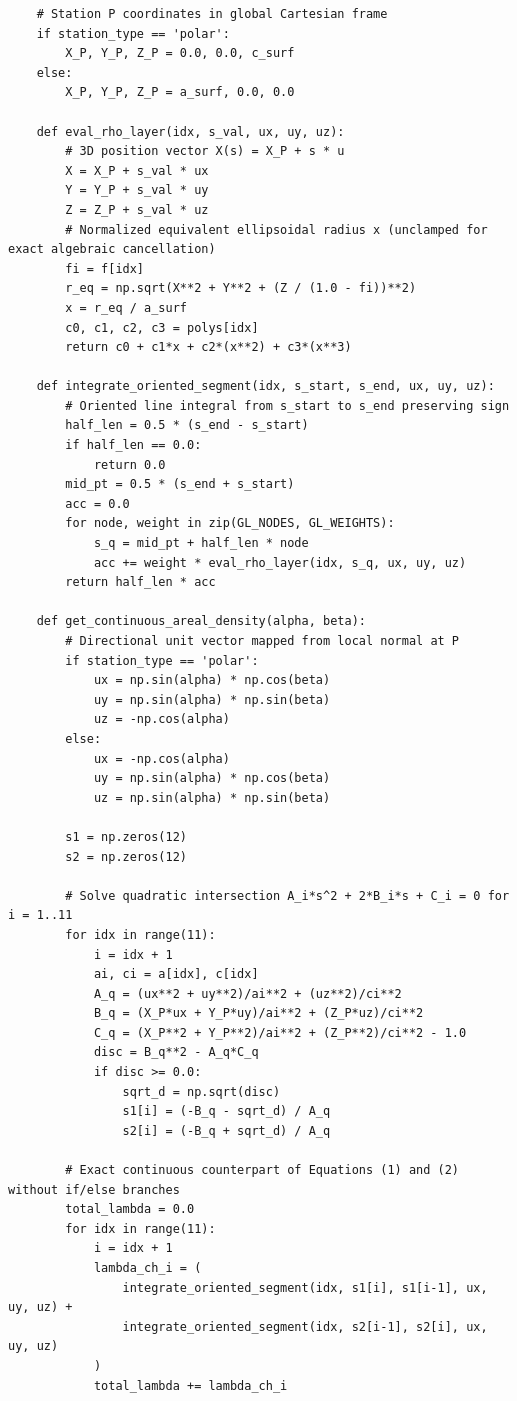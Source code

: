 \begin{lstlisting}
    # Station P coordinates in global Cartesian frame
    if station_type == 'polar':
        X_P, Y_P, Z_P = 0.0, 0.0, c_surf
    else:
        X_P, Y_P, Z_P = a_surf, 0.0, 0.0

    def eval_rho_layer(idx, s_val, ux, uy, uz):
        # 3D position vector X(s) = X_P + s * u
        X = X_P + s_val * ux
        Y = Y_P + s_val * uy
        Z = Z_P + s_val * uz
        # Normalized equivalent ellipsoidal radius x (unclamped for exact algebraic cancellation)
        fi = f[idx]
        r_eq = np.sqrt(X**2 + Y**2 + (Z / (1.0 - fi))**2)
        x = r_eq / a_surf
        c0, c1, c2, c3 = polys[idx]
        return c0 + c1*x + c2*(x**2) + c3*(x**3)

    def integrate_oriented_segment(idx, s_start, s_end, ux, uy, uz):
        # Oriented line integral from s_start to s_end preserving sign
        half_len = 0.5 * (s_end - s_start)
        if half_len == 0.0:
            return 0.0
        mid_pt = 0.5 * (s_end + s_start)
        acc = 0.0
        for node, weight in zip(GL_NODES, GL_WEIGHTS):
            s_q = mid_pt + half_len * node
            acc += weight * eval_rho_layer(idx, s_q, ux, uy, uz)
        return half_len * acc

    def get_continuous_areal_density(alpha, beta):
        # Directional unit vector mapped from local normal at P
        if station_type == 'polar':
            ux = np.sin(alpha) * np.cos(beta)
            uy = np.sin(alpha) * np.sin(beta)
            uz = -np.cos(alpha)
        else:
            ux = -np.cos(alpha)
            uy = np.sin(alpha) * np.cos(beta)
            uz = np.sin(alpha) * np.sin(beta)
            
        s1 = np.zeros(12)
        s2 = np.zeros(12)
        
        # Solve quadratic intersection A_i*s^2 + 2*B_i*s + C_i = 0 for i = 1..11
        for idx in range(11):
            i = idx + 1
            ai, ci = a[idx], c[idx]
            A_q = (ux**2 + uy**2)/ai**2 + (uz**2)/ci**2
            B_q = (X_P*ux + Y_P*uy)/ai**2 + (Z_P*uz)/ci**2
            C_q = (X_P**2 + Y_P**2)/ai**2 + (Z_P**2)/ci**2 - 1.0
            disc = B_q**2 - A_q*C_q
            if disc >= 0.0:
                sqrt_d = np.sqrt(disc)
                s1[i] = (-B_q - sqrt_d) / A_q
                s2[i] = (-B_q + sqrt_d) / A_q
                
        # Exact continuous counterpart of Equations (1) and (2) without if/else branches
        total_lambda = 0.0
        for idx in range(11):
            i = idx + 1
            lambda_ch_i = (
                integrate_oriented_segment(idx, s1[i], s1[i-1], ux, uy, uz) +
                integrate_oriented_segment(idx, s2[i-1], s2[i], ux, uy, uz)
            )
            total_lambda += lambda_ch_i
            

\end{lstlisting}
